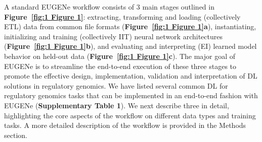 A standard EUGENe workflow consists of 3 main stages outlined in \textbf{Figure~\ref{fig:1 Figure 1}}: extracting, transforming and loading (collectively ETL) data from common file formats (\textbf{Figure~\ref{fig:1 Figure 1}a}), instantiating, initializing and training (collectively IIT) neural network architectures (\textbf{Figure~\ref{fig:1 Figure 1}b}), and evaluating and interpreting (EI) learned model behavior on held-out data (\textbf{Figure~\ref{fig:1 Figure 1}c}). The major goal of EUGENe is to streamline the end-to-end execution of these three stages to promote the effective design, implementation, validation and interpretation of DL solutions in regulatory genomics. We have listed several common DL for regulatory genomics tasks that can be implemented in an end-to-end fashion with EUGENe (\textbf{Supplementary Table 1}). We next describe three in detail, highlighting the core aspects of the workflow on different data types and training tasks. A more detailed description of the workflow is provided in the Methods section.

